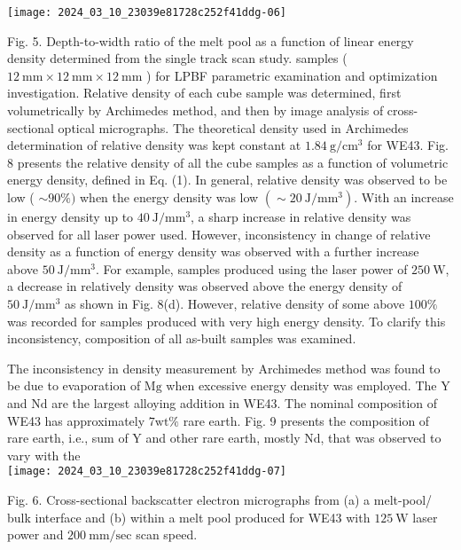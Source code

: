 \documentclass[10pt]{article}
\begin{document}
\begin{center}
\texttt{[image: 2024\_03\_10\_23039e81728c252f41ddg-06]}
\end{center}

Fig. 5. Depth-to-width ratio of the melt pool as a function of linear energy density determined from the single track scan study. samples ( $12 \mathrm{~mm} \times 12 \mathrm{~mm} \times 12 \mathrm{~mm}$ ) for LPBF parametric examination and optimization investigation. Relative density of each cube sample was determined, first volumetrically by Archimedes method, and then by image analysis of cross-sectional optical micrographs. The theoretical density used in Archimedes determination of relative density was kept constant at $1.84 \mathrm{~g} / \mathrm{cm}^{3}$ for WE43. Fig. 8 presents the relative density of all the cube samples as a function of volumetric energy density, defined in Eq. (1). In general, relative density was observed to be low ( $\sim 90 \%)$ when the energy density was low $\left(\sim 20 \mathrm{~J} / \mathrm{mm}^{3}\right)$. With an increase in energy density up to $40 \mathrm{~J} / \mathrm{mm}^{3}$, a sharp increase in relative density was observed for all laser power used. However, inconsistency in change of relative density as a function of energy density was observed with a further increase above $50 \mathrm{~J} / \mathrm{mm}^{3}$. For example, samples produced using the laser power of $250 \mathrm{~W}$, a decrease in relatively density was observed above the energy density of $50 \mathrm{~J} / \mathrm{mm}^{3}$ as shown in Fig. 8(d). However, relative density of some above $100 \%$ was recorded for samples produced with very high energy density. To clarify this inconsistency, composition of all as-built samples was examined.

The inconsistency in density measurement by Archimedes method was found to be due to evaporation of $\mathrm{Mg}$ when excessive energy density was employed. The $\mathrm{Y}$ and $\mathrm{Nd}$ are the largest alloying addition in WE43. The nominal composition of WE43 has approximately $7 \mathrm{wt} \%$ rare earth. Fig. 9 presents the composition of rare earth, i.e., sum of Y and other rare earth, mostly $\mathrm{Nd}$, that was observed to vary with the\\
\texttt{[image: 2024\_03\_10\_23039e81728c252f41ddg-07]}

Fig. 6. Cross-sectional backscatter electron micrographs from (a) a melt-pool/ bulk interface and (b) within a melt pool produced for WE43 with $125 \mathrm{~W}$ laser power and $200 \mathrm{~mm} / \mathrm{sec}$ scan speed.
\end{document}
